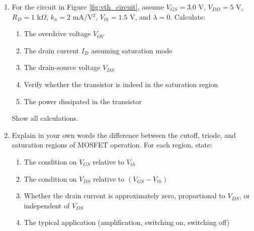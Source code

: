 \documentclass[10pt]{article}
\begin{document}
\begin{enumerate}
    
    \item For the circuit in Figure \ref{fig:vth_circuit}, assume $V_{GS} = 3. 0$ V, $V_{DD} = 5$ V, $R_D = 1$ k$\Omega$, $k_n = 2$ mA/V$^2$, $V_{th} = 1.5$ V, and $\lambda = 0$. Calculate:
    \begin{enumerate}
        \item The overdrive voltage $V_{OV}$
        \item The drain current $I_D$ assuming saturation mode
        \item The drain-source voltage $V_{DS}$
        \item Verify whether the transistor is indeed in the saturation region
        \item The power dissipated in the transistor
    \end{enumerate}
    Show all calculations. 
    
    \item Explain in your own words the difference between the cutoff, triode, and saturation regions of MOSFET operation.  For each region, state: 
    \begin{enumerate}
        \item The condition on $V_{GS}$ relative to $V_{th}$
        \item The condition on $V_{DS}$ relative to $(V_{GS} - V_{th})$
        \item Whether the drain current is approximately zero, proportional to $V_{DS}$, or independent of $V_{DS}$
        \item The typical application (amplification, switching on, switching off)
    \end{enumerate}
    
\end{enumerate}
\end{document}
